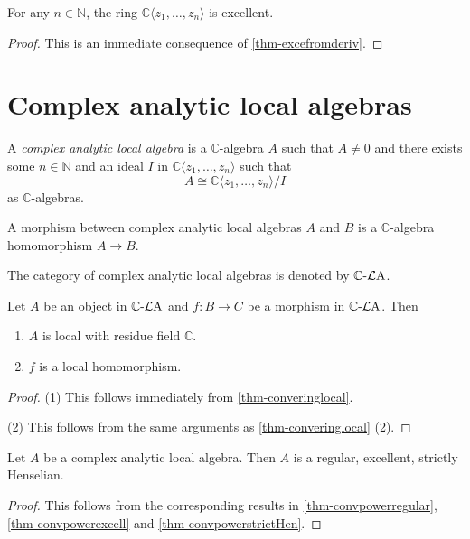 \begin{thm}\label{thm-convpowerexcell}
    For any $n\in \mathbb{N}$, the ring $\mathbb{C}\langle z_1,\ldots,z_n \rangle$ is excellent.
\end{thm}
\begin{proof}
    This is an immediate consequence of \cref{thm-excefromderiv}.
\end{proof}

\section{Complex analytic local algebras}

\begin{definition}\label{def-complexanalylocaalg}
    A \emph{complex analytic local algebra} is a $\mathbb{C}$-algebra $A$ such that $A\neq 0$ and there exists some $n\in \mathbb{N}$ and an ideal $I$ in $\mathbb{C}\langle z_1,\ldots,z_n \rangle$ such that 
    \[
        A\cong \mathbb{C}\langle z_1,\ldots,z_n \rangle/I
    \]
    as $\mathbb{C}$-algebras.

    A morphism between complex analytic local algebras $A$ and $B$ is a $\mathbb{C}$-algebra homomorphism $A\rightarrow B$.

    The category of complex analytic local algebras is denoted by $\mathbb{C}\text{-}\mathcal{L}\mathrm{A}$.
\end{definition}

\begin{proposition}\label{prop-converinglocalgeneral}
    Let $A$ be an object in $\mathbb{C}\text{-}\mathcal{L}\mathrm{A}$ and $f:B\rightarrow C$ be a morphism in  $\mathbb{C}\text{-}\mathcal{L}\mathrm{A}$. Then
    \begin{enumerate}
        \item $A$ is local with residue field $\mathbb{C}$.
        \item $f$ is a local homomorphism.
    \end{enumerate}
\end{proposition}
\begin{proof}
    (1) This follows immediately from \cref{thm-converinglocal}.
    
    (2) This follows from the same arguments as \cref{thm-converinglocal} (2).
\end{proof}

\begin{proposition}\label{prop-analocalgwellbehaved}
    Let $A$ be a complex analytic local algebra. Then $A$ is a regular, excellent, strictly Henselian. 
\end{proposition}
\begin{proof}
    This follows from the corresponding results in \cref{thm-convpowerregular}, \cref{thm-convpowerexcell} and \cref{thm-convpowerstrictHen}.
\end{proof}


